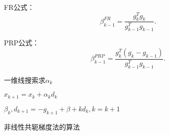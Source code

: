 FR公式：
\begin{equation}
    \beta_{k-1}^{FR}=\displaystyle\frac{g_k^Tg_k}{g_{k-1}^Tg_{k-1}} .
    \nonumber
\end{equation}
        
PRP公式：
\begin{equation}
    \beta_{k-1}^{PRP}=\displaystyle\frac{g_k^T(g_k-g_{k-1})}{g_{k-1}^Tg_{k-1}} .
    \nonumber
\end{equation}

\begin{algorithm}

    \SetAlgoLined

     {
        一维线搜索求$\alpha_k$
        
        $x_{k+1}=x_k+\alpha_kd_k$

        $\beta_k,d_{k+1}=-g_{k+1}+\beta+kd_k,k=k+1$
    }
    \caption{非线性共轭梯度法的算法}
\end{algorithm}

